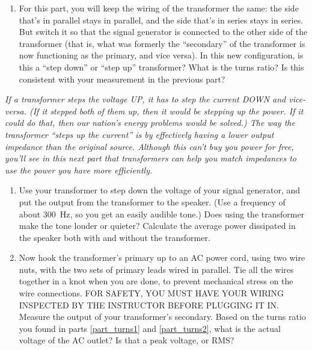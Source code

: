\begin{enumerate}[wide]
\item For this part, you will keep the wiring of the transformer the same: the side that's in parallel stays in parallel, and the side that's in series stays in series. But switch it so that the signal generator is connected to the other side of the transformer (that is, what was formerly the ``secondary'' of the transformer is now functioning as the primary, and vice versa).  In this new configuration, is this a ``step down'' or ``step up'' transformer?  What is the turns ratio?  Is this consistent with your measurement in the previous part? \label{part_turns2}

\end{enumerate}

\textit{If a transformer steps the voltage UP, it has to step the current DOWN and vice-versa.  (If it stepped both of them up, then it would be stepping up the power.  If it could do that, then our nation's energy problems would be solved.)  The way the transformer ``steps up the current'' is by effectively having a lower output impedance than the original source.  Although this can't buy you power for free, you'll see in this next part that transformers can help you match impedances to use the power you have more efficiently.}

\begin{enumerate}

\item Use your transformer to step down the voltage of your signal generator, and put the output from the transformer to the speaker.  (Use a frequency of about 300~Hz, so you get an easily audible tone.)  Does using the transformer make the tone louder or quieter?  Calculate the average power dissipated in the speaker both with and without the transformer.  

\item Now hook the transformer's primary up to an AC power cord, using two wire nuts, with the two sets of primary leads wired in parallel.  Tie all the wires together in a knot when you are done, to prevent mechanical stress on the wire connections.  FOR SAFETY, YOU MUST HAVE YOUR WIRING INSPECTED BY THE INSTRUCTOR BEFORE PLUGGING IT IN.  Measure the output of your transformer's secondary.  Based on the turns ratio you found in parts \ref{part_turns1} and \ref{part_turns2}, what is the actual voltage of the AC outlet?  Is that a peak voltage, or RMS?

\end{enumerate}






